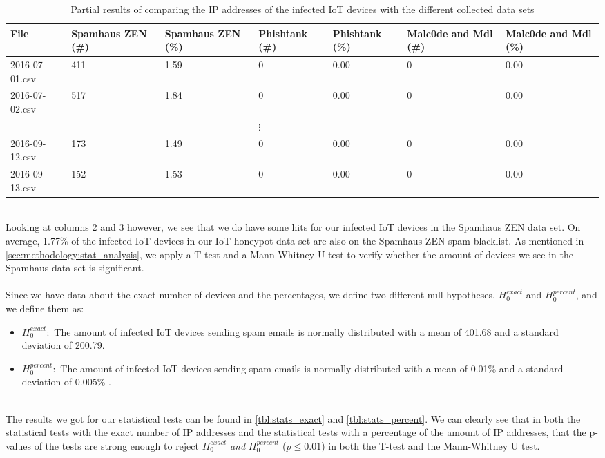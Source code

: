 \documentclass[a4paper,10pt]{article}
\begin{document}
\begin{table}[h]
 \begin{tabularx}{\linewidth}{lXXXXXX}
 \toprule
 File & Spamhaus ZEN (\#) & Spamhaus ZEN (\%) & Phishtank (\#) &  Phishtank (\%) & Malc0de and Mdl (\#) & Malc0de and Mdl (\%) \\
 \midrule
 2016-07-01.csv & 411 & 1.59 & 0 & 0.00 & 0 & 0.00 \\
 2016-07-02.csv & 517 & 1.84 & 0 & 0.00 & 0 & 0.00 \\
 &  &  & $\vdots$ &  &  &  \\
2016-09-12.csv & 173 & 1.49 & 0 & 0.00 & 0 & 0.00 \\
2016-09-13.csv & 152 & 1.53 & 0 & 0.00 & 0 & 0.00 \\
 \bottomrule
 \end{tabularx}
 \caption{Partial results of comparing the IP addresses of the infected IoT devices with the different collected data sets}
 \label{tbl:results_partial}
\end{table}
~\\
Looking at columns 2 and 3 however, we see that we do have some hits for our  infected IoT devices in the Spamhaus
ZEN data set. On average, 1.77\% of the infected IoT devices in our IoT honeypot data set are also on the Spamhaus ZEN
spam blacklist. As mentioned in \autoref{sec:methodology:stat_analysis}, we apply a T-test  and a Mann-Whitney U test
to verify whether the amount of devices we see in the Spamhaus data set is significant. 
\\\\
Since we have data about the exact number of devices and the percentages, we define two different null hypotheses, 
$H_0^{exact}$ and $H_0^{percent}$, and we define them as:
\begin{itemize}
 \item[] $H_0^{exact}:$ The amount of infected IoT devices sending spam emails is normally distributed with a mean 
 of 401.68 and  a standard deviation of 200.79.
 \item[] $H_0^{percent}:$ The amount of infected IoT devices sending spam emails is normally distributed with a mean 
 of 0.01\% and  a standard deviation of 0.005\% .
\end{itemize}
~\\
The results we got for our statistical tests can be found in \autoref{tbl:stats_exact} and \autoref{tbl:stats_percent}. We 
can clearly see that in both the statistical tests with the exact number of IP addresses and the statistical tests with a 
percentage of the amount of IP addresses, that the p-values of the tests are strong enough to reject  $H_0^{exact}$ 
\textit{and} $H_0^{percent}$ ($p \leq 0.01$) in both the T-test and the Mann-Whitney U test.
\end{document}
